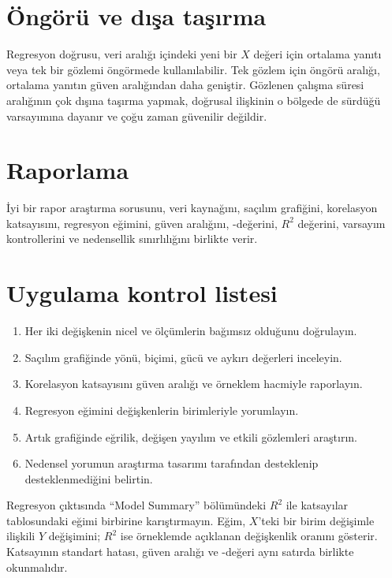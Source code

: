 \section{Öngörü ve dışa taşırma}
\label{sec:extrapolation}

Regresyon doğrusu, veri aralığı içindeki yeni bir $X$ değeri için ortalama
yanıtı veya tek bir gözlemi öngörmede kullanılabilir. Tek gözlem için öngörü
aralığı, ortalama yanıtın güven aralığından daha geniştir. Gözlenen çalışma
süresi aralığının çok dışına taşırma yapmak, doğrusal ilişkinin o bölgede de
sürdüğü varsayımına dayanır ve çoğu zaman güvenilir değildir.

\section{Raporlama}

İyi bir rapor araştırma sorusunu, veri kaynağını, saçılım grafiğini,
korelasyon katsayısını, regresyon eğimini, güven aralığını, \pval-değerini,
$R^2$ değerini, varsayım kontrollerini ve nedensellik sınırlılığını birlikte
verir.

\section{Uygulama kontrol listesi}

\begin{enumerate}
  \item Her iki değişkenin nicel ve ölçümlerin bağımsız olduğunu doğrulayın.
  \item Saçılım grafiğinde yönü, biçimi, gücü ve aykırı değerleri inceleyin.
  \item Korelasyon katsayısını güven aralığı ve örneklem hacmiyle raporlayın.
  \item Regresyon eğimini değişkenlerin birimleriyle yorumlayın.
  \item Artık grafiğinde eğrilik, değişen yayılım ve etkili gözlemleri araştırın.
  \item Nedensel yorumun araştırma tasarımı tarafından desteklenip desteklenmediğini belirtin.
\end{enumerate}

\begin{outputguidebox}
Regresyon çıktısında ``Model Summary'' bölümündeki $R^2$ ile katsayılar
tablosundaki eğimi birbirine karıştırmayın. Eğim, $X$'teki bir birim değişimle
ilişkili $Y$ değişimini; $R^2$ ise örneklemde açıklanan değişkenlik oranını
gösterir. Katsayının standart hatası, güven aralığı ve \pval-değeri aynı satırda
birlikte okunmalıdır.
\end{outputguidebox}


